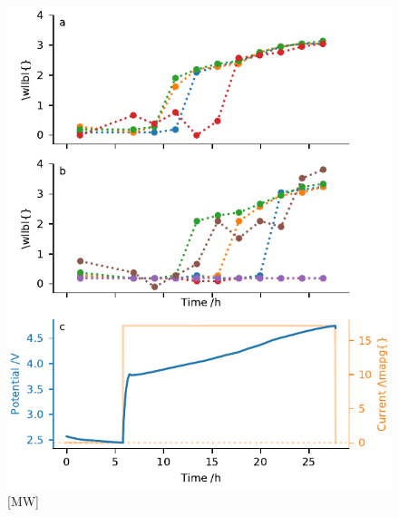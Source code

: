 \documentclass{article}
\begin{document}
\begin{figure}
  \includegraphics{figures/NCA-particles-irradiation.pdf}
  \caption{[MW]}
  \label{fig:nca-irradiation}
\end{figure}
\end{document}
